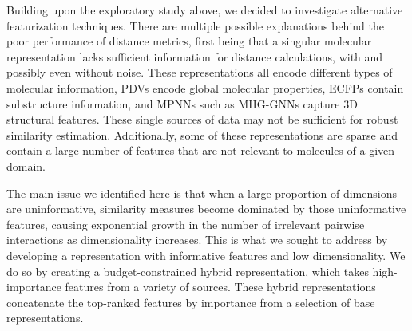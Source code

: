 Building upon the exploratory study above, we decided to investigate alternative featurization techniques. There are multiple possible explanations behind the poor performance of distance metrics, first being that a singular molecular representation lacks sufficient information for distance calculations, with and possibly even without noise. These representations all encode different types of molecular information, PDVs encode global molecular properties, ECFPs contain substructure information, and MPNNs such as MHG-GNNs capture 3D structural features. These single sources of data may not be sufficient for robust similarity estimation. Additionally, some of these representations are sparse and contain a large number of features that are not relevant to molecules of a given domain. 

The main issue we identified here is that when a large proportion of dimensions are uninformative, similarity measures become dominated by those uninformative features, causing exponential growth in the number of irrelevant pairwise interactions as dimensionality increases. This is what we sought to address by developing a representation with informative features and low dimensionality. We do so by creating a budget-constrained hybrid representation, which takes high-importance features from a variety of sources. These hybrid representations concatenate the top-ranked features by importance from a selection of base representations. 


